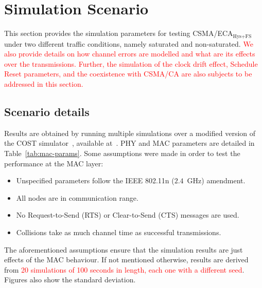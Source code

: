 \section{Simulation Scenario}\label{simulations}
This section provides the simulation parameters for testing CSMA/ECA$_{\text{Hys+FS}}$ under two different traffic conditions, namely saturated and non-saturated. \textcolor{red}{We also provide details on how channel errors are modelled and what are its effects over the transmissions. Further, the simulation of the clock drift effect, Schedule Reset parameters, and the coexistence with CSMA/CA are also subjects to be addressed in this section.}

	\subsection{Scenario details}
	Results are obtained by running multiple simulations over a modified version of the COST simulator~\cite{COST}, available at~\cite{sim:parameters-TON}. PHY and MAC parameters are detailed in Table~\ref{tab:mac-params}. Some assumptions were made in order to test the performance at the MAC layer:
	
	\begin{itemize}
		\item Unspecified parameters follow the IEEE 802.11n ($2.4$~GHz) amendment.
		\item All nodes are in communication range.
		\item No Request-to-Send (RTS) or Clear-to-Send (CTS) messages are used.
		\item Collisions take as much channel time as successful transmissions.
	\end{itemize}
	
	The aforementioned assumptions ensure that the simulation results are just effects of the MAC behaviour.
	If not mentioned otherwise, results are derived from \textcolor{red}{20 simulations of 100 seconds in length, each one with a different seed}. Figures also show the standard deviation.
	
